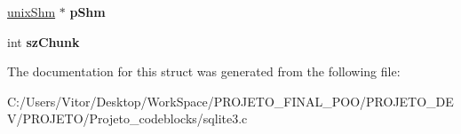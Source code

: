 \begin{DoxyCompactItemize}
\item 
\hypertarget{structunix_file_a53c653bd73cdc6f518ecffe95062e91a}{\hyperlink{structunix_shm}{unix\-Shm} $\ast$ {\bfseries p\-Shm}}\label{structunix_file_a53c653bd73cdc6f518ecffe95062e91a}

\item 
\hypertarget{structunix_file_a5f6307d3446ce1b149df756c00c3bd2e}{int {\bfseries sz\-Chunk}}\label{structunix_file_a5f6307d3446ce1b149df756c00c3bd2e}

\end{DoxyCompactItemize}


The documentation for this struct was generated from the following file\-:\begin{DoxyCompactItemize}
\item 
C\-:/\-Users/\-Vitor/\-Desktop/\-Work\-Space/\-P\-R\-O\-J\-E\-T\-O\-\_\-\-F\-I\-N\-A\-L\-\_\-\-P\-O\-O/\-P\-R\-O\-J\-E\-T\-O\-\_\-\-D\-E\-V/\-P\-R\-O\-J\-E\-T\-O/\-Projeto\-\_\-codeblocks/sqlite3.\-c\end{DoxyCompactItemize}
